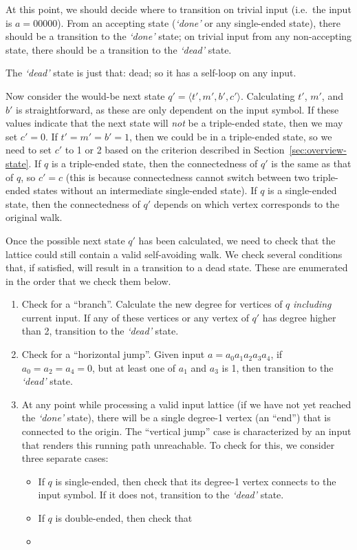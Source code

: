 At this point, we should decide where to transition on trivial input (i.e.\ the input is $a=00000$). From an accepting state (\emph{`done'} or any single-ended state), there should be a transition to the \emph{`done'} state; on trivial input from any non-accepting state, there should be a transition to the \emph{`dead'} state.

The \emph{`dead'} state is just that: dead; so it has a self-loop on any input.

Now consider the would-be next state $q'=\langle t', m', b', c' \rangle$. Calculating $t'$, $m'$, and $b'$ is straightforward, as these are only dependent on the input symbol. If these values indicate that the next state will \emph{not} be a triple-ended state, then we may set $c'=0$. If $t'=m'=b'=1$, then we could be in a triple-ended state, so we need to set $c'$ to 1 or 2 based on the criterion described in Section~\ref{sec:overview-state}. If $q$ is a triple-ended state, then the connectedness of $q'$ is the same as that of $q$, so $c'=c$ (this is because connectedness cannot switch between two triple-ended states without an intermediate single-ended state). If $q$ is a single-ended state, then the connectedness of $q'$ depends on which vertex corresponds to the original walk.

Once the possible next state $q'$ has been calculated, we need to check that the lattice could still contain a valid self-avoiding walk. We check several conditions that, if satisfied, will result in a transition to a dead state. These are enumerated in the order that we check them below.
\begin{enumerate}
\item Check for a ``branch''. Calculate the new degree for vertices of $q$ \emph{including} current input. If any of these vertices or any vertex of $q'$ has degree higher than 2, transition to the \emph{`dead'} state.
\item Check for a ``horizontal jump''. Given input $a=a_0a_1a_2a_3a_4$, if $a_0 = a_2 = a_4 = 0$, but at least one of $a_1$ and $a_3$ is 1, then transition to the \emph{`dead'} state.
\item At any point while processing a valid input lattice (if we have not yet reached the \emph{`done'} state), there will be a single degree-1 vertex (an ``end'') that is connected to the origin. The ``vertical jump'' case is characterized by an input that renders this running path unreachable. To check for this, we consider three separate cases:
\begin{itemize}
\item If $q$ is single-ended, then check that its degree-1 vertex connects to the input symbol. If it does not, transition to the \emph{`dead'} state. 
\item If $q$ is double-ended, then check that \emph{}
\item 
\end{itemize}
\end{enumerate}

